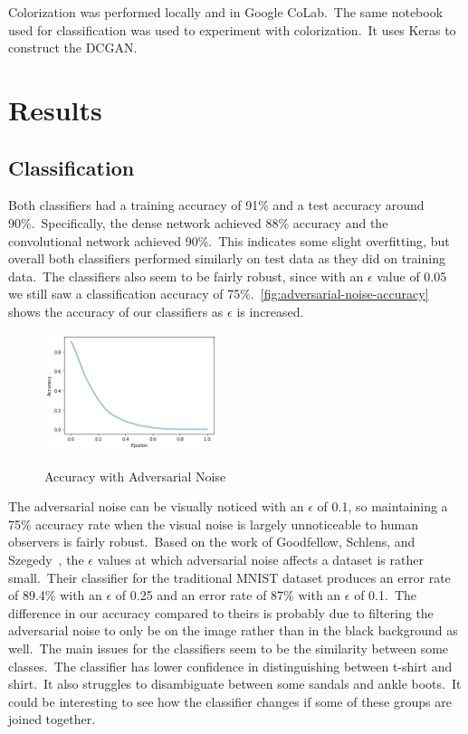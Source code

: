 \documentclass[conference]{IEEEtran}
\begin{document}
    Colorization was performed locally and in Google CoLab.\ The same notebook used for classification was used to experiment with colorization.\ It uses Keras to construct the DCGAN\@.

    \section{Results}\label{sec:results}

    \subsection{Classification}\label{subsec:results-classification}

    Both classifiers had a training accuracy of 91\% and a test accuracy around 90\%.\ Specifically, the dense network achieved 88\% accuracy and the convolutional network achieved 90\%.\ This indicates some slight overfitting, but overall both classifiers performed similarly on test data as they did on training data.\ The classifiers also seem to be fairly robust, since with an \(\epsilon\) value of 0.05 we still saw a classification accuracy of 75\%.~\autoref{fig:adversarial-noise-accuracy} shows the accuracy of our classifiers as \(\epsilon\) is increased.
    
    \begin{figure}
        \begin{center}
            \caption{Accuracy with Adversarial Noise}
            \includegraphics[width=0.45\textwidth]{Adversarial Accuracy.png}
            \label{fig:adversarial-noise-accuracy}
        \end{center}
    \end{figure}
    
    The adversarial noise can be visually noticed with an \(\epsilon\) of 0.1, so maintaining a 75\% accuracy rate when the visual noise is largely unnoticeable to human observers is fairly robust.\ Based on the work of Goodfellow, Schlens, and Szegedy~\cite{adversarialexamples}, the \(\epsilon\) values at which adversarial noise affects a dataset is rather small.\ Their classifier for the traditional MNIST dataset produces an error rate of 89.4\% with an \(\epsilon\) of 0.25 and an error rate of 87\% with an \(\epsilon\) of 0.1.\ The difference in our accuracy compared to theirs is probably due to filtering the adversarial noise to only be on the image rather than in the black background as well.\ The main issues for the classifiers seem to be the similarity between some classes.\ The classifier has lower confidence in distinguishing between t-shirt and shirt.\ It also struggles to disambiguate between some sandals and ankle boots.\ It could be interesting to see how the classifier changes if some of these groups are joined together.
\end{document}
